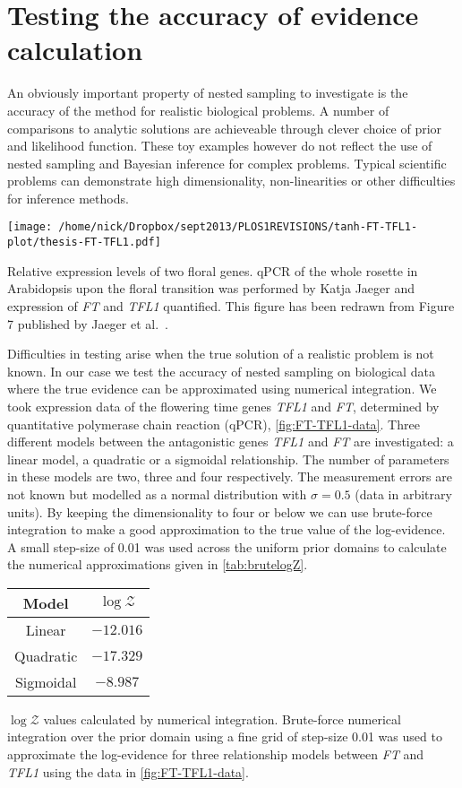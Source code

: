 \section{Testing the accuracy of evidence calculation}
An obviously important property of nested sampling to investigate is the accuracy of the method for realistic biological problems.
A number of comparisons to analytic solutions are achieveable through clever choice of prior and likelihood function.
These toy examples however do not reflect the use of nested sampling and Bayesian inference for complex problems.
Typical scientific problems can demonstrate high dimensionality, non-linearities or other difficulties for inference methods.
\begin{marginfigure}[-100pt]
    \texttt{[image: /home/nick/Dropbox/sept2013/PLOS1REVISIONS/tanh-FT-TFL1-plot/thesis-FT-TFL1.pdf]}
    \caption{Relative expression levels of two floral genes.
      qPCR of the whole rosette in Arabidopsis upon the floral transition was performed by Katja Jaeger and expression of \emph{FT} and \emph{TFL1} quantified.
      This figure has been redrawn from Figure 7 published by Jaeger et al.~\cite{jaeger2013}.
  }
  \label{fig:FT-TFL1-data}
\end{marginfigure}
Difficulties in testing arise when the true solution of a realistic problem is not known.
In our case we test the accuracy of nested sampling on biological data where the true evidence can be approximated using numerical integration.
We took expression data of the flowering time genes \emph{TFL1} and \emph{FT}, determined by quantitative polymerase chain reaction (qPCR), \autoref{fig:FT-TFL1-data}. 
Three different models between the antagonistic genes \emph{TFL1} and \emph{FT} are investigated: a linear model, a quadratic or a sigmoidal relationship. 
The number of parameters in these models are two, three and four respectively.
The measurement errors are not known but modelled as a normal distribution with $\sigma = 0.5$ (data in arbitrary units).
By keeping the dimensionality to four or below we can use brute-force integration to make a good approximation to the true value of the log-evidence.
A small step-size of 0.01 was used across the uniform prior domains to calculate the numerical approximations given in \autoref{tab:brutelogZ}.
\begin{margintable}
  \begin{tabular}{cc}
    \toprule
    Model & $\log\mathcal Z$\\
    \midrule
    Linear & $-12.016$\\
    Quadratic & $-17.329$\\
    Sigmoidal & $-8.987$\\
    \bottomrule
  \end{tabular}
  \caption{$\log\mathcal Z$ values calculated by numerical integration.
    Brute-force numerical integration over the prior domain using a fine grid of step-size 0.01 was used to approximate the log-evidence for three relationship models between \emph{FT} and \emph{TFL1} using the data in \autoref{fig:FT-TFL1-data}.
  }
  \label{tab:brutelogZ}
\end{margintable}

